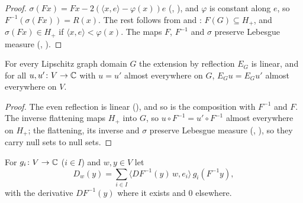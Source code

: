 \begin{proof}
\leanok
$\sigma(F x) = F x - 2 (\langle x, e \rangle - \varphi(x)) e$ (,
), and $\varphi$ is constant along $e$, so
$F^{-1}(\sigma(F x)) = R(x)$. The rest follows from  and
: $F(G) \subseteq H_+$, and $\sigma(F x) \in H_+$ if
$\langle x, e \rangle < \varphi(x)$. The maps $F$, $F^{-1}$ and $\sigma$ preserve Lebesgue measure
(, ).
\end{proof}

\begin{lemma}
\label{lem:reflection-extension-linear}
\leanok
{}
For every Lipschitz graph domain $G$ the extension by reflection $E_G$ is linear, and for all
$u, u' \colon V \to \mathbb{C}$ with $u = u'$ almost everywhere on $G$, $E_G u = E_G u'$ almost
everywhere on $V$.
\end{lemma}

\begin{proof}
\leanok
The even reflection is linear (), and so is the composition with
$F^{-1}$ and $F$. The inverse flattening maps $H_+$ into $G$, so
$u \circ F^{-1} = u' \circ F^{-1}$ almost everywhere on $H_+$; the flattening, its inverse and
$\sigma$ preserve Lebesgue measure (,
), so they carry null sets to null sets.
\end{proof}

For $g_i \colon V \to \mathbb{C}$ ($i \in I$) and $w, y \in V$ let
\[
  D_w(y) = \sum_{i \in I} \bigl\langle DF^{-1}(y) \, w, e_i \bigr\rangle \, g_i(F^{-1} y) ,
\]
with the derivative $DF^{-1}(y)$ where it exists and $0$ elsewhere.

